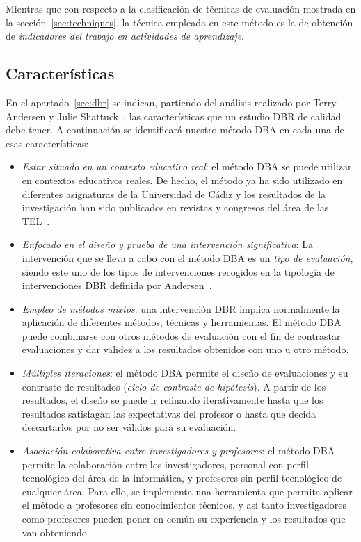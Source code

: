 Mientras que con respecto a la clasificación de técnicas de evaluación mostrada en la sección~\ref{sec:techniques}, la técnica empleada en este método es la de obtención de \emph{indicadores del trabajo en actividades de aprendizaje}.

\subsection{Características}

En el apartado~\ref{sec:dbr} se indican, partiendo del análisis realizado por Terry Andersen y Julie Shattuck~\cite{anderson2012design}, las características que un estudio DBR de calidad debe tener. A continuación se identificará nuestro método DBA en cada una de esas características:

\begin{itemize}
\item \emph{Estar situado en un contexto educativo real}: el método DBA se puede utilizar en contextos educativos reales. De hecho, el método ya ha sido utilizado en diferentes asignaturas de la Universidad de Cádiz y los resultados de la investigación han sido publicados en revistas y congresos del área de las TEL~\cite{Balderas:2012,Balderas:2013,balderas2013generative,Balderas:2015,balderas2015domain}.
\item \emph{Enfocado en el diseño y prueba de una intervención significativa}: La intervención que se lleva a cabo con el método DBA es un \emph{tipo de evaluación}, siendo este uno de los tipos de intervenciones recogidos en la tipología de intervenciones DBR definida por Andersen~\cite{anderson2012design}. 
\item \emph{Empleo de métodos mixtos}: una intervención DBR implica normalmente la aplicación de diferentes métodos, técnicas y herramientas. El método DBA puede combinarse con otros métodos de evaluación con el fin de contrastar evaluaciones y dar validez a los resultados obtenidos con uno u otro método.
\item \emph{Múltiples iteraciones}: el método DBA permite el diseño de evaluaciones y su contraste de resultados (\emph{ciclo de contraste de hipótesis}). A partir de los resultados, el diseño se puede ir refinando iterativamente hasta que los resultados satisfagan las expectativas del profesor o hasta que decida descartarlos por no ser válidos para su evaluación.
\item \emph{Asociación colaborativa entre investigadores y profesores}: el método DBA permite la colaboración entre los investigadores, personal con perfil tecnológico del área de la informática, y profesores sin perfil tecnológico de cualquier área. Para ello, se implementa una herramienta que permita aplicar el método a profesores sin conocimientos técnicos, y así tanto investigadores como profesores pueden poner en común su experiencia y los resultados que van obteniendo.

\end{itemize}
